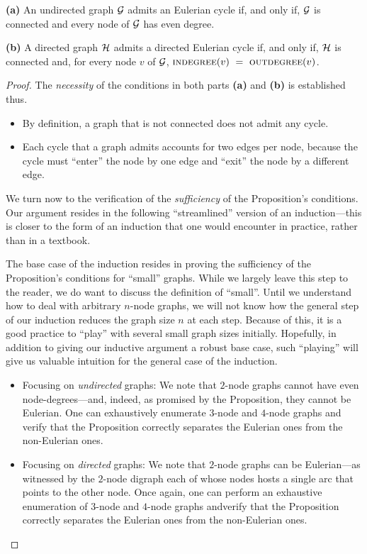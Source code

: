 \begin{prop}
\label{thm:eulerian-cycle}
{\bf (a)}
An undirected graph $\mbox{$\cal G$}$ admits an Eulerian cycle if, and only if,
$\mbox{$\cal G$}$ is connected and every node of $\mbox{$\cal G$}$ has even degree.

{\bf (b)}
A directed graph $\mbox{$\cal H$}$ admits a directed Eulerian cycle if, and only if,
$\mbox{$\cal H$}$ is connected and, for every node $v$ of $\mbox{$\cal G$}$,
$\mbox{\sc indegree}(v) \ = \ \mbox{\sc outdegree}(v)$.
\end{prop}

\begin{proof}
The {\em necessity} of the conditions in both parts {\bf (a)} and {\bf
  (b)} is established thus.
\begin{itemize}
\item
By definition, a graph that is not connected does not admit any cycle.
\item
Each cycle that a graph admits accounts for two edges per node,
because the cycle must ``enter'' the node by one edge and ``exit'' the
node by a different edge.
\end{itemize}

\smallskip

\noindent
We turn now to the verification of the {\em sufficiency} of the
Proposition's conditions.  Our argument resides in the following
``streamlined'' version of an induction---this is closer to the form
of an induction that one would encounter in practice, rather than in a
textbook.

The base case of the induction resides in proving the sufficiency of
the Proposition's conditions for ``small'' graphs.  While we largely
leave this step to the reader, we do want to discuss the definition of
``small''.  Until we understand how to deal with arbitrary $n$-node
graphs, we will not know how the general step of our induction reduces
the graph size $n$ at each step.  Because of this, it is a good
practice to ``play'' with several small graph sizes initially.
Hopefully, in addition to giving our inductive argument a robust base
case, such ``playing'' will give us valuable intuition for the general
case of the induction.
\begin{itemize}
\item
Focusing on {\em undirected} graphs: We note that $2$-node graphs
cannot have even node-degrees---and, indeed, as promised by the
Proposition, they cannot be Eulerian.  One can exhaustively enumerate
$3$-node and $4$-node graphs and verify that the Proposition correctly
separates the Eulerian ones from the non-Eulerian ones.
\item
Focusing on {\em directed} graphs: We note that $2$-node graphs can be
Eulerian---as witnessed by the $2$-node digraph each of whose nodes
hosts a single arc that points to the other node.  Once again, one can
perform an exhaustive enumeration of $3$-node and $4$-node graphs
andverify that the Proposition correctly separates the Eulerian ones
from the non-Eulerian ones.
\end{itemize}


\end{proof}
